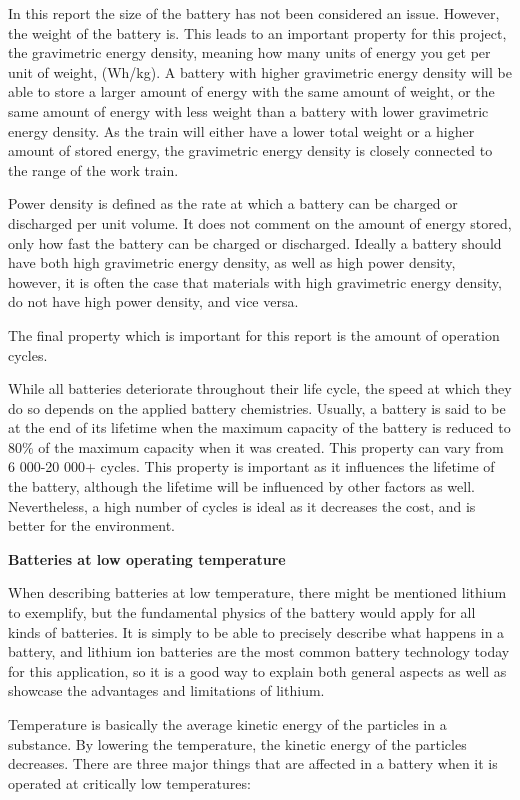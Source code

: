\documentclass{article}
\begin{document}
In this report the size of the battery has not been considered an issue. However, the weight of the battery is. This leads to an important property for this project, the gravimetric energy density, meaning how many units of energy you get per unit of weight, (Wh/kg). A battery with higher gravimetric energy density will be able to store a larger amount of energy with the same amount of weight, or the same amount of energy with less weight than a battery with lower gravimetric energy density. As the train will either have a lower total weight or a higher amount of stored energy, the gravimetric energy density is closely connected to the range of the work train.
 
Power density is defined as the rate at which a battery can be charged or discharged per unit volume. It does not comment on the amount of energy stored, only how fast the battery can be charged or discharged. Ideally a battery should have both high gravimetric energy density, as well as high power density, however, it is often the case that materials with high gravimetric energy density, do not have high power density, and vice versa.

The final property which is important for this report is the amount of operation cycles.

While all batteries deteriorate throughout their life cycle, the speed at which they do so depends on the applied battery chemistries. Usually, a battery is said to be at the end of its lifetime when the maximum capacity of the battery is reduced to 80\% of the maximum capacity when it was created. This property can vary from 6 000-20 000+ cycles. This property is important as it influences the lifetime of the battery, although the lifetime will be influenced by other factors as well. Nevertheless, a high number of cycles is ideal as it decreases the cost, and is better for the environment.

\textbf{Batteries at low operating temperature}

When describing batteries at low temperature, there might be mentioned lithium to exemplify, but the fundamental physics of the battery would apply for all kinds of batteries. It is simply to be able to precisely describe what happens in a battery, and lithium ion batteries are the most common battery technology today for this application, so it is a good way to explain both general aspects as well as showcase the advantages and limitations of lithium.

Temperature is basically the average kinetic energy of the particles in a substance. By lowering the temperature, the kinetic energy of the particles decreases. There are three major things that are affected in a battery when it is operated at critically low temperatures:
\end{document}
